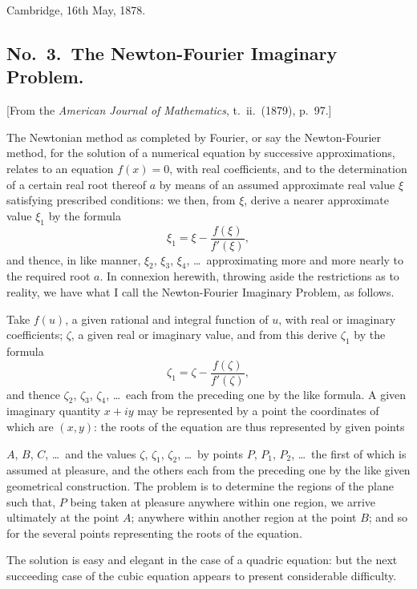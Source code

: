 \documentclass[11pt,a4paper]{book}
\begin{document}
Cambridge, 16th May, 1878.

\subsection*{No.\ 3.\ The Newton-Fourier Imaginary Problem.}

[From the \textit{American Journal of Mathematics}, t.\ ii.\ (1879), p.\ 97.]

\medskip

The Newtonian method as completed by Fourier, or say the Newton-Fourier method, for the solution of a numerical equation by successive approximations, relates to an equation $f(x) = 0$, with real coefficients, and to the determination of a certain real root thereof $a$ by means of an assumed approximate real value $\xi$ satisfying prescribed conditions: we then, from $\xi$, derive a nearer approximate value $\xi_1$ by the formula
\[
\xi_1 = \xi - \frac{f(\xi)}{f'(\xi)},
\]
and thence, in like manner, $\xi_2$, $\xi_3$, $\xi_4$, \dots\ approximating more and more nearly to the required root $a$. In connexion herewith, throwing aside the restrictions as to reality, we have what I call the Newton-Fourier Imaginary Problem, as follows.

Take $f(u)$, a given rational and integral function of $u$, with real or imaginary coefficients; $\zeta$, a given real or imaginary value, and from this derive $\zeta_1$ by the formula
\[
\zeta_1 = \zeta - \frac{f(\zeta)}{f'(\zeta)},
\]
and thence $\zeta_2$, $\zeta_3$, $\zeta_4$, \dots\ each from the preceding one by the like formula. A given imaginary quantity $x + iy$ may be represented by a point the coordinates of which are $(x, y)$: the roots of the equation are thus represented by given points

\clearpage
$A$, $B$, $C$, \dots\ and the values $\zeta$, $\zeta_1$, $\zeta_2$, \dots\ by points $P$, $P_1$, $P_2$, \dots\ the first of which is assumed at pleasure, and the others each from the preceding one by the like given geometrical construction. The problem is to determine the regions of the plane such that, $P$ being taken at pleasure anywhere within one region, we arrive ultimately at the point $A$; anywhere within another region at the point $B$; and so for the several points representing the roots of the equation.

The solution is easy and elegant in the case of a quadric equation: but the next succeeding case of the cubic equation appears to present considerable difficulty.
\end{document}
